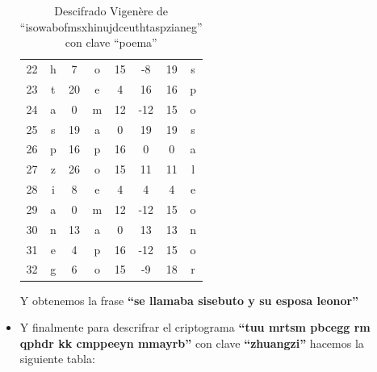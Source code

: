 \begin{itemize}
\begin{table}[H]
\begin{tabular}{|c|c|c|c|c|c|c|c|}
        22 & h & 7  & o & 15 & -8  & 19 & s \\
        23 & t & 20 & e & 4  & 16  & 16 & p \\
        24 & a & 0  & m & 12 & -12 & 15 & o \\
        25 & s & 19 & a & 0  & 19  & 19 & s \\
        26 & p & 16 & p & 16 & 0   & 0  & a \\
        27 & z & 26 & o & 15 & 11  & 11 & l \\
        28 & i & 8  & e & 4  & 4   & 4  & e \\
        29 & a & 0  & m & 12 & -12 & 15 & o \\
        30 & n & 13 & a & 0  & 13  & 13 & n \\
        31 & e & 4  & p & 16 & -12 & 15 & o \\
        32 & g & 6  & o & 15 & -9  & 18 & r \\
        \hline
        \end{tabular}
        \caption{Descifrado Vigen\`{e}re de ``isowabofmsxhinujdceuthtaspzianeg'' con clave ``poema''}
        \label{tab:vigenere_descifrado}
        \end{table}

    Y obtenemos la frase \textbf{``se llamaba sisebuto y su esposa leonor''}

    \item Y finalmente para descrifrar el criptograma \textbf{``tuu mrtsm pbcegg rm qphdr kk cmppeeyn mmayrb''}
    con clave \textbf{``zhuangzi''} hacemos la siguiente tabla:


\end{itemize}
